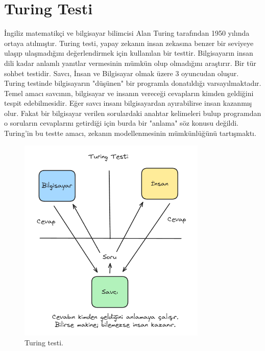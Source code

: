\section{Turing Testi}
İngiliz matematikçi ve bilgisayar bilimcisi Alan Turing tarafından 1950 yılında ortaya atılmıştır. Turing testi, yapay zekanın insan zekasına benzer bir seviyeye ulaşıp ulaşmadığını değerlendirmek için kullanılan bir testtir. Bilgisayarın insan dili kadar anlamlı yanıtlar vermesinin mümkün olup olmadığını araştırır. Bir tür sohbet testidir. Savcı, İnsan ve Bilgisayar olmak üzere 3 oyuncudan oluşur. Turing testinde bilgisayarın "düşünen" bir programla donatıldığı varsayılmaktadır. Temel amacı savcının, bilgisayar ve insanın vereceği cevapların kimden geldiğini tespit edebilmesidir. Eğer savcı insanı bilgisayardan ayırabilirse insan kazanmış olur. Fakat bir bilgisayar verilen sorulardaki anahtar kelimeleri bulup programdan o soruların cevaplarını getirdiği için burda bir "anlama" söz konusu değildi. Turing'in bu testte amacı, zekanın modellenmesinin mümkünlüğünü tartışmaktı.

\begin{figure}[h]
    \centering
    \includegraphics[width=0.8\textwidth]{images/turing_test.png}
    \caption{Turing testi.}
    \label{fig:enter-label}
\end{figure}

\newpage
